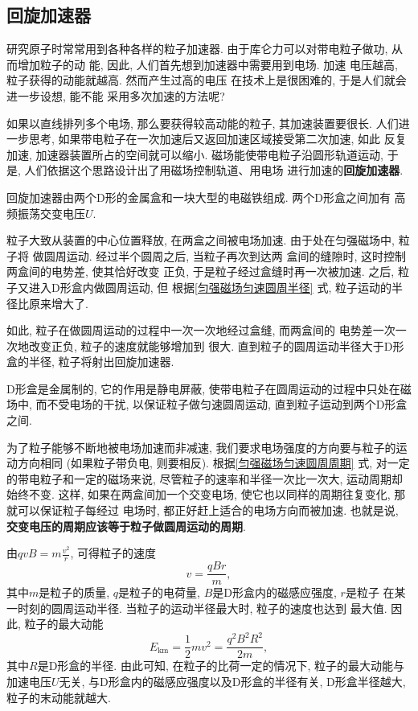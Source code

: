 \documentclass[11pt,a4paper]{ctexbook}
\begin{document}
\subsection{回旋加速器}
研究原子时常常用到各种各样的粒子加速器.
由于库仑力可以对带电粒子做功, 从而增加粒子的动
能, 因此, 人们首先想到加速器中需要用到电场. 加速
电压越高, 粒子获得的动能就越高. 然而产生过高的电压
在技术上是很困难的, 于是人们就会进一步设想, 能不能
采用多次加速的方法呢?

如果以直线排列多个电场, 那么要获得较高动能的粒子, 其加速装置要很长. 人们进一步思考,
如果带电粒子在一次加速后又返回加速区域接受第二次加速, 如此
反复加速, 加速器装置所占的空间就可以缩小. 磁场能使带电粒子沿圆形轨道运动,
于是, 人们依据这个思路设计出了用磁场控制轨道、用电场
进行加速的\textbf{回旋加速器}.

回旋加速器由两个D形的金属盒和一块大型的电磁铁组成. 两个D形盒之间加有
高频振荡交变电压$U$.

粒子大致从装置的中心位置释放, 在两盒之间被电场加速. 由于处在匀强磁场中, 粒子将
做圆周运动. 经过半个圆周之后, 当粒子再次到达两
盒间的缝隙时, 这时控制两盒间的电势差, 使其恰好改变
正负, 于是粒子经过盒缝时再一次被加速. 之后, 粒子又进入D形盒内做圆周运动, 但
根据\eqref{匀强磁场匀速圆周半径} 式,
粒子运动的半径比原来增大了.

如此, 粒子在做圆周运动的过程中一次一次地经过盒缝, 而两盒间的
电势差一次一次地改变正负, 粒子的速度就能够增加到
很大. 直到粒子的圆周运动半径大于D形盒的半径,
粒子将射出回旋加速器.

D形盒是金属制的, 它的作用是静电屏蔽, 使带电粒子在圆周运动的过程中只处在磁场中,
而不受电场的干扰, 以保证粒子做匀速圆周运动, 直到粒子运动到两个D形盒之间.

为了粒子能够不断地被电场加速而非减速, 我们要求电场强度的方向要与粒子的运动方向相同
(如果粒子带负电, 则要相反). 根据\eqref{匀强磁场匀速圆周周期} 式,
对一定的带电粒子和一定的磁场来说, 尽管粒子的速率和半径一次比一次大, 运动周期却始终不变.
这样, 如果在两盒间加一个交变电场, 使它也以同样的周期往复变化, 那就可以保证粒子每经过
电场时, 都正好赶上适合的电场方向而被加速.
也就是说, \textbf{交变电压的周期应该等于粒子做圆周运动的周期}.

由$qvB = m\displaystyle\frac{v^2}{r}$, 可得粒子的速度$$v = \frac{qBr}{m},$$
其中$m$是粒子的质量, $q$是粒子的电荷量, $B$是D形盒内的磁感应强度, $r$是粒子
在某一时刻的圆周运动半径. 当粒子的运动半径最大时, 粒子的速度也达到
最大值. 因此, 粒子的最大动能$$E_\mathrm{km} = \frac12mv^2 = \frac{q^2B^2R^2}{2m},$$
其中$R$是D形盒的半径. 由此可知, 在粒子的比荷一定的情况下, 粒子的最大动能与加速电压$U$无关,
与D形盒内的磁感应强度以及D形盒的半径有关, D形盒半径越大, 粒子的末动能就越大.
\end{document}
